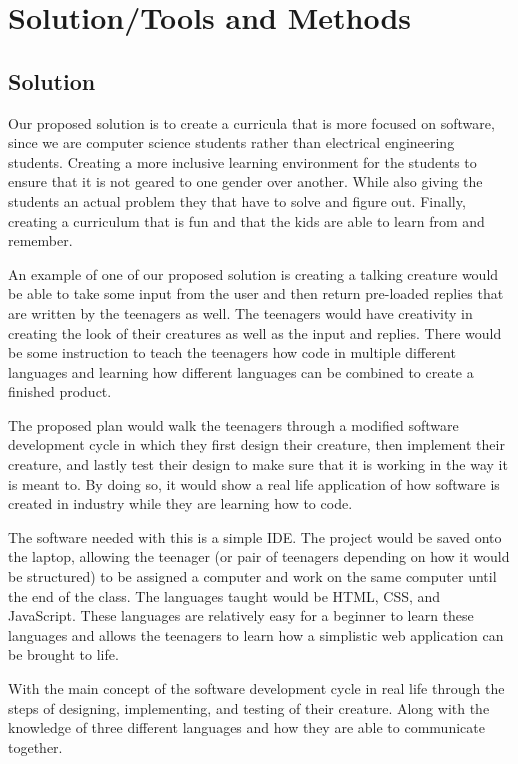 \documentclass[10pt,a4paper,onecolumn,draftclsnofoot]{IEEEtran}
\begin{document}
\section*{Solution/Tools and Methods}

\subsection*{Solution}
Our proposed solution is to create a curricula that is more focused on software, since we are computer science students rather than electrical engineering students. Creating a more inclusive learning environment for the students to ensure that it is not geared to one gender over another. While also giving the students an actual problem they that have to solve and figure out. Finally, creating a curriculum that is fun and that the kids are able to learn from and remember.

An example of one of our proposed solution is creating a talking creature would be able to take some input from the user and then return pre-loaded replies that are written by the teenagers as well. The teenagers would have creativity in creating the look of their creatures as well as the input and replies. There would be some instruction to teach the teenagers how code in multiple different languages and learning how different languages can be combined to create a finished product. 

The proposed plan would walk the teenagers through a modified software development cycle in which they first design their creature, then implement their creature, and lastly test their design to make sure that it is working in the way it is meant to. By doing so, it would show a real life application of how software is created in industry while they are learning how to code.

The software needed with this is a simple IDE. The project would be saved onto the laptop, allowing the teenager (or pair of teenagers depending on how it would be structured) to be assigned a computer and work on the same computer until the end of the class. The languages taught would be HTML, CSS, and JavaScript. These languages are relatively easy for a beginner to learn these languages and allows the teenagers to learn how a simplistic web application can be brought to life.

With the main concept of the software development cycle in real life through the steps of designing, implementing, and testing of their creature. Along with the knowledge of three different languages and how they are able to communicate together.
\end{document}
